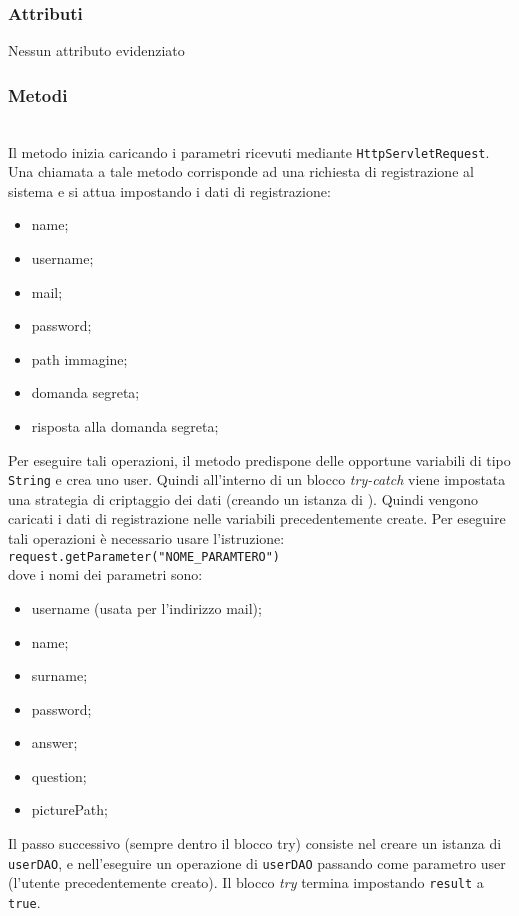 \subsubsection*{Attributi}

Nessun attributo evidenziato

\subsubsection*{Metodi}
\begin{description}
	\item{}\\

Il metodo inizia caricando i parametri ricevuti mediante \texttt{HttpServletRequest}. Una chiamata a tale metodo corrisponde ad una richiesta di registrazione al sistema e si attua impostando i dati di registrazione:
	\begin{itemize}
		\item name;
		\item username;
		\item mail;
		\item password;
		\item path immagine;
		\item domanda segreta;
		\item risposta alla domanda segreta;
	\end{itemize}
	Per eseguire tali operazioni, il metodo predispone delle opportune variabili di tipo \texttt{String} e crea uno  user. Quindi all'interno di un blocco \textit{try-catch} viene impostata una strategia di criptaggio dei dati (creando un istanza di ). Quindi vengono caricati i dati di registrazione nelle variabili precedentemente create. Per eseguire tali operazioni è necessario usare l'istruzione:\\
	
	\verb|request.getParameter("NOME_PARAMTERO")|\\
	
	dove i nomi dei parametri sono:
	\begin{itemize}
		\item username (usata per l'indirizzo mail);
		\item name;
		\item surname;
		\item password;
		\item answer;
		\item question;
		\item picturePath;
	\end{itemize}
	Il passo successivo (sempre dentro il blocco try) consiste nel creare un istanza di  \texttt{userDAO}, e nell'eseguire un operazione di \texttt{userDAO}  passando come parametro user (l'utente precedentemente creato). Il blocco \textit{try} termina impostando \texttt{result} a \texttt{true}.
	

\end{description}
